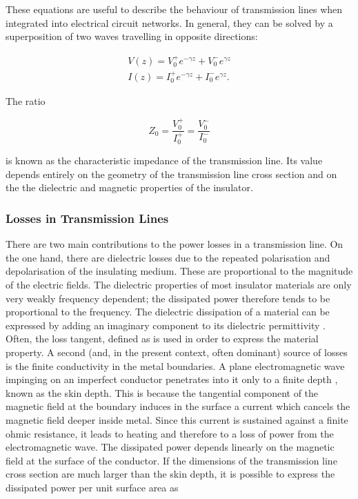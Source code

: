 These equations are useful to describe the behaviour of transmission
lines when integrated into electrical circuit networks. In general, they
can be solved by a superposition of two waves travelling in opposite
directions:

\begin{eqnarray}
V(z) = V_0^+ e^{-\gamma z} + V_0^- e^{\gamma z} \\ 
I(z) = I_0^+ e^{-\gamma z} + I_0^- e^{\gamma z}.
\end{eqnarray}

The ratio

\begin{equation}
Z_0 = \frac{V_0^+}{I_0^+} = \frac{V_0^-}{I_0^-}
\end{equation}

is known as the characteristic impedance of the transmission line. Its
value depends entirely on the geometry of the transmission line cross
section and on the the dielectric and magnetic properties of the
insulator.

\subsubsection{Losses in Transmission
Lines}\label{losses-in-transmission-lines}

There are two main contributions to the power losses in a transmission
line. On the one hand, there are dielectric losses due to the repeated
polarisation and depolarisation of the insulating medium. These are
proportional to the magnitude of the electric fields. The dielectric
properties of most insulator materials are only very weakly frequency
dependent; the dissipated power therefore tends to be proportional to
the frequency. The dielectric dissipation of a material can be expressed
by adding an imaginary component to its dielectric permittivity
. Often, the loss tangent, defined
as  is used in order to express
the material property. A second (and, in the present context, often
dominant) source of losses is the finite conductivity in the metal
boundaries. A plane electromagnetic wave impinging on an imperfect
conductor penetrates into it only to a finite depth \m{\delta}, known as
the skin depth. This is because the tangential component of the magnetic
field at the boundary induces in the surface a current which cancels the
magnetic field deeper inside metal. Since this current is sustained
against a finite ohmic resistance, it leads to heating and therefore to
a loss of power from the electromagnetic wave. The dissipated power
depends linearly on the magnetic field at the surface of the conductor.
If the dimensions of the transmission line cross section are much larger
than the skin depth, it is possible to express the dissipated power per
unit surface area as

